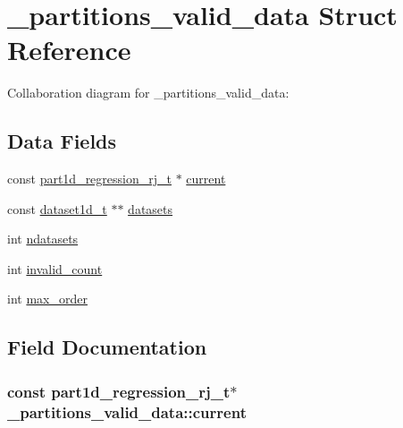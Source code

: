 \hypertarget{struct__partitions__valid__data}{}\section{\+\_\+partitions\+\_\+valid\+\_\+data Struct Reference}
\label{struct__partitions__valid__data}


Collaboration diagram for \+\_\+partitions\+\_\+valid\+\_\+data\+:
\subsection*{Data Fields}
\begin{DoxyCompactItemize}
\item 
const \hyperlink{part1d__regression__rj_8h_aa2f35f4fdfcc952190e95c0a9f50fd2f}{part1d\+\_\+regression\+\_\+rj\+\_\+t} $\ast$ \hyperlink{struct__partitions__valid__data_a97665797fe5fbf772566044a3a1c6ed7}{current}
\item 
const \hyperlink{dataset1d_8h_a232f8372957af83ed6a261e9b89dd8f6}{dataset1d\+\_\+t} $\ast$$\ast$ \hyperlink{struct__partitions__valid__data_a6da49e27b8983847edbbccddcf6ea095}{datasets}
\item 
int \hyperlink{struct__partitions__valid__data_a3bcc831a5b99511cb41d0d555bd7d502}{ndatasets}
\item 
int \hyperlink{struct__partitions__valid__data_a81e550abce65cfa1419fed02a757e6d9}{invalid\+\_\+count}
\item 
int \hyperlink{struct__partitions__valid__data_aa5dada8e61f09259a2887367247c8a1c}{max\+\_\+order}
\end{DoxyCompactItemize}


\subsection{Field Documentation}
\subsubsection[{\texorpdfstring{current}{current}}]{\setlength{\rightskip}{0pt plus 5cm}const {\bf part1d\+\_\+regression\+\_\+rj\+\_\+t}$\ast$ \+\_\+partitions\+\_\+valid\+\_\+data\+::current}\hypertarget{struct__partitions__valid__data_a97665797fe5fbf772566044a3a1c6ed7}{}\label{struct__partitions__valid__data_a97665797fe5fbf772566044a3a1c6ed7}
